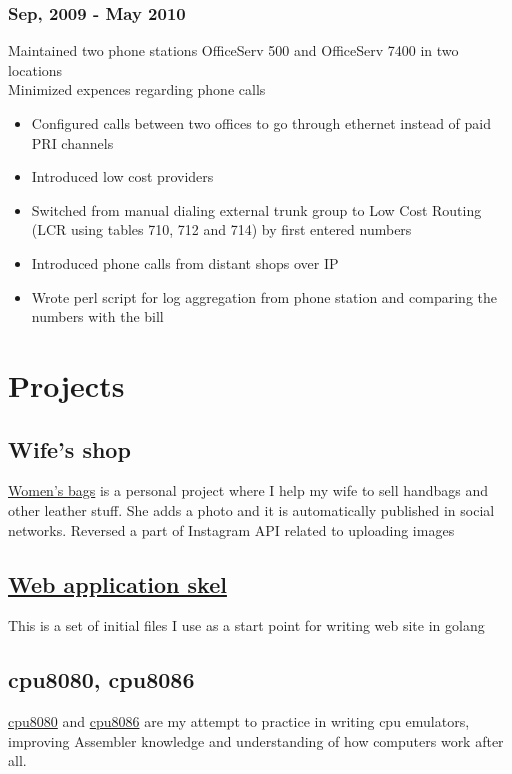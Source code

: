 \documentclass[letterpaper]{article}
\begin{document}
\subsubsection{Sep, 2009 - May 2010}
\label{sec-2-4-1}
Maintained two phone stations OfficeServ 500 and OfficeServ 7400 in two locations\\
Minimized expences regarding phone calls
\begin{itemize}
\item Configured calls between two offices to go through ethernet instead of paid PRI channels
\item Introduced low cost providers
\item Switched from manual dialing external trunk group to Low Cost Routing (LCR using tables 710, 712 and 714) by first entered numbers
\item Introduced phone calls from distant shops over IP
\item Wrote perl script for log aggregation from phone station and comparing the numbers with the bill
\end{itemize}

\section{Projects}
\label{sec-3}

\subsection{Wife's shop}
\label{sec-3-1}
\href{https://bars.kh.ua}{Women's bags} is a personal project where I help my wife to sell handbags and other leather stuff. She adds a photo and it is automatically published in social networks. Reversed a part of Instagram API related to uploading images
\subsection{\href{https://github.com/AlexJakeGreen/bars}{Web application skel}}
\label{sec-3-2}
This is a set of initial files I use as a start point for writing web site in golang
\subsection{cpu8080, cpu8086}
\label{sec-3-3}
\href{https://github.com/AlexJakeGreen/cpu8080}{cpu8080} and \href{https://github.com/AlexJakeGreen/cpu8086}{cpu8086} are my attempt to practice in writing cpu emulators, improving Assembler knowledge and understanding of how computers work after all.
\end{document}
